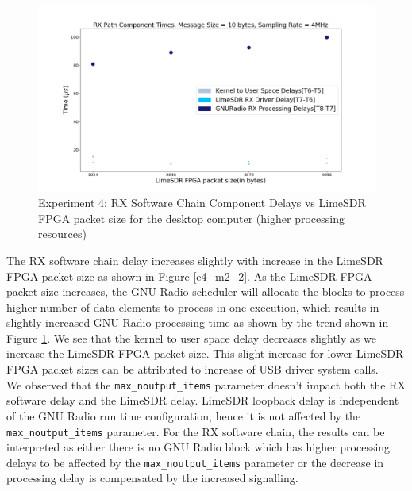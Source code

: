 \begin{figure}[h!]
\centering
\includegraphics[width=\textwidth]{Thesis/Figure/E4M2-3.png}
\caption{Experiment 4: RX Software Chain Component Delays vs LimeSDR FPGA packet size for the desktop computer (higher processing resources)}
\label{e4_m2_3}
\end{figure}

The RX software chain delay increases slightly with increase in the LimeSDR FPGA packet size as shown in Figure \ref{e4_m2_2}.
As the LimeSDR FPGA packet size increases, the GNU Radio scheduler will allocate the blocks to process higher number of data elements to process in one execution, which results in slightly increased GNU Radio processing time as shown by the trend shown in Figure \ref{e4_m2_3}.
We see that the kernel to user space delay decreases slightly as we increase the LimeSDR FPGA packet size.
This slight increase for lower LimeSDR FPGA packet sizes can be attributed to increase of USB driver system calls.\\

We observed that the \texttt{max\_noutput\_items} parameter doesn't impact both the RX software delay and the LimeSDR delay.
LimeSDR loopback delay is independent of the GNU Radio run time configuration, hence it is not affected by the \texttt{max\_noutput\_items} parameter.
For the RX software chain, the results can be interpreted as either there is no GNU Radio block which has higher processing delays to be affected by the \texttt{max\_noutput\_items} parameter or the decrease in processing delay is compensated by the increased signalling.\\

